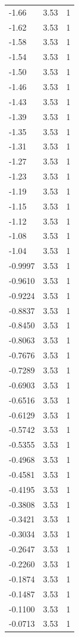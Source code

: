 \begin{longtable}{lrr}
  -1.66 & 3.53 & 1 \\
  -1.62 & 3.53 & 1 \\
  -1.58 & 3.53 & 1 \\
  -1.54 & 3.53 & 1 \\
  -1.50 & 3.53 & 1 \\
  -1.46 & 3.53 & 1 \\
  -1.43 & 3.53 & 1 \\
  -1.39 & 3.53 & 1 \\
  -1.35 & 3.53 & 1 \\
  -1.31 & 3.53 & 1 \\
  -1.27 & 3.53 & 1 \\
  -1.23 & 3.53 & 1 \\
  -1.19 & 3.53 & 1 \\
  -1.15 & 3.53 & 1 \\
  -1.12 & 3.53 & 1 \\
  -1.08 & 3.53 & 1 \\
  -1.04 & 3.53 & 1 \\
  -0.9997 & 3.53 & 1 \\
  -0.9610 & 3.53 & 1 \\
  -0.9224 & 3.53 & 1 \\
  -0.8837 & 3.53 & 1 \\
  -0.8450 & 3.53 & 1 \\
  -0.8063 & 3.53 & 1 \\
  -0.7676 & 3.53 & 1 \\
  -0.7289 & 3.53 & 1 \\
  -0.6903 & 3.53 & 1 \\
  -0.6516 & 3.53 & 1 \\
  -0.6129 & 3.53 & 1 \\
  -0.5742 & 3.53 & 1 \\
  -0.5355 & 3.53 & 1 \\
  -0.4968 & 3.53 & 1 \\
  -0.4581 & 3.53 & 1 \\
  -0.4195 & 3.53 & 1 \\
  -0.3808 & 3.53 & 1 \\
  -0.3421 & 3.53 & 1 \\
  -0.3034 & 3.53 & 1 \\
  -0.2647 & 3.53 & 1 \\
  -0.2260 & 3.53 & 1 \\
  -0.1874 & 3.53 & 1 \\
  -0.1487 & 3.53 & 1 \\
  -0.1100 & 3.53 & 1 \\
  -0.0713 & 3.53 & 1 \\

\end{longtable}
